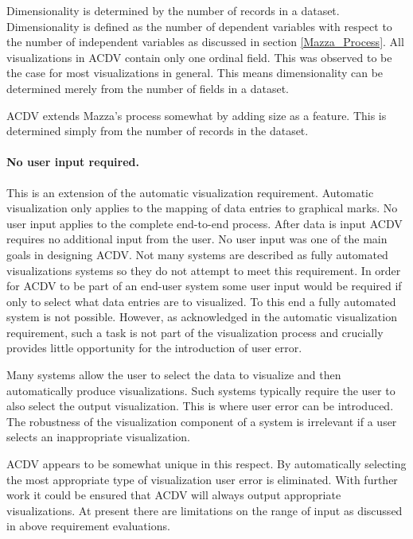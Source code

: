 \documentclass[a4paper, 11pt, titlepage, onehalfspacing]{report}
\begin{document}
Dimensionality is determined by the number of records in a dataset. Dimensionality is defined as the number of dependent variables with respect to the number of independent variables as discussed in section \ref{Mazza_Process}. All visualizations in AC\lightning{}DV contain only one ordinal field. This was observed to be the case for most visualizations in general. This means dimensionality can be determined merely from the number of fields in a dataset.

AC\lightning{}DV extends Mazza's process somewhat by adding size as a feature. This is determined simply from the number of records in the dataset.

\paragraph{No user input required.} This is an extension of the automatic visualization requirement. Automatic visualization only applies to the mapping of data entries to graphical marks. No user input applies to the complete end-to-end process. After data is input AC\lightning{}DV requires no additional input from the user. No user input was one of the main goals in designing AC\lightning{}DV. Not many systems are described as fully automated visualizations systems so they do not attempt to meet this requirement. In order for AC\lightning{}DV to be part of an end-user system some user input would be required if only to select what data entries are to visualized. To this end a fully automated system is not possible. However, as acknowledged in the automatic visualization requirement, such a task is not part of the visualization process and crucially provides little opportunity for the introduction of user error.

Many systems allow the user to select the data to visualize and then automatically produce visualizations. Such systems typically require the user to also select the output visualization. This is where user error can be introduced. The robustness of the visualization component of a system is irrelevant if a user selects an inappropriate visualization.

AC\lightning{}DV appears to be somewhat unique in this respect. By automatically selecting the most appropriate type of visualization user error is eliminated. With further work it could be ensured that AC\lightning{}DV will always output appropriate visualizations. At present there are limitations on the range of input as discussed in above requirement evaluations. 
\end{document}
